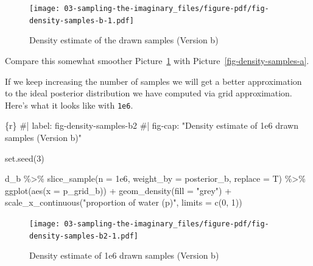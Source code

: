 \documentclass[
  letterpaper,
  DIV=11,
  numbers=noendperiod]{scrreprt}
\newenvironment{Shaded}{\begin{snugshade}}{\end{snugshade}}
\newcommand{\AttributeTok}[1]{\textcolor[rgb]{0.40,0.45,0.13}{#1}}
\newcommand{\CommentTok}[1]{\textcolor[rgb]{0.37,0.37,0.37}{#1}}
\newcommand{\DecValTok}[1]{\textcolor[rgb]{0.68,0.00,0.00}{#1}}
\newcommand{\FloatTok}[1]{\textcolor[rgb]{0.68,0.00,0.00}{#1}}
\newcommand{\FunctionTok}[1]{\textcolor[rgb]{0.28,0.35,0.67}{#1}}
\newcommand{\InformationTok}[1]{\textcolor[rgb]{0.37,0.37,0.37}{#1}}
\newcommand{\NormalTok}[1]{\textcolor[rgb]{0.00,0.23,0.31}{#1}}
\newcommand{\SpecialCharTok}[1]{\textcolor[rgb]{0.37,0.37,0.37}{#1}}
\newcommand{\StringTok}[1]{\textcolor[rgb]{0.13,0.47,0.30}{#1}}
\begin{document}
\begin{figure}[H]

{\centering \texttt{[image: 03-sampling-the-imaginary\_files/figure-pdf/fig-density-samples-b-1.pdf]}

}

\caption{\label{fig-density-samples-b}Density estimate of the drawn
samples (Version b)}

\end{figure}

Compare this somewhat smoother Picture~\ref{fig-density-samples-b} with
Picture~\ref{fig-density-samples-a}.

If we keep increasing the number of samples we will get a better
approximation to the ideal posterior distribution we have computed via
grid approximation. Here's what it looks like with \texttt{1e6}.

\begin{Shaded}
\begin{Highlighting}[]
\InformationTok{\textasciigrave{}\textasciigrave{}\textasciigrave{}\{r\}}
\CommentTok{\#| label: fig{-}density{-}samples{-}b2}
\CommentTok{\#| fig{-}cap: "Density estimate of 1e6 drawn samples (Version b)"}

\FunctionTok{set.seed}\NormalTok{(}\DecValTok{3}\NormalTok{)}

\NormalTok{d\_b }\SpecialCharTok{\%\textgreater{}\%} 
  \FunctionTok{slice\_sample}\NormalTok{(}\AttributeTok{n =} \FloatTok{1e6}\NormalTok{, }\AttributeTok{weight\_by =}\NormalTok{ posterior\_b, }\AttributeTok{replace =}\NormalTok{ T) }\SpecialCharTok{\%\textgreater{}\%} 
  \FunctionTok{ggplot}\NormalTok{(}\FunctionTok{aes}\NormalTok{(}\AttributeTok{x =}\NormalTok{ p\_grid\_b)) }\SpecialCharTok{+}
  \FunctionTok{geom\_density}\NormalTok{(}\AttributeTok{fill =} \StringTok{"grey"}\NormalTok{) }\SpecialCharTok{+}
  \FunctionTok{scale\_x\_continuous}\NormalTok{(}\StringTok{"proportion of water (p)"}\NormalTok{, }\AttributeTok{limits =} \FunctionTok{c}\NormalTok{(}\DecValTok{0}\NormalTok{, }\DecValTok{1}\NormalTok{))}
\InformationTok{\textasciigrave{}\textasciigrave{}\textasciigrave{}}
\end{Highlighting}
\end{Shaded}

\begin{figure}[H]

{\centering \texttt{[image: 03-sampling-the-imaginary\_files/figure-pdf/fig-density-samples-b2-1.pdf]}

}

\caption{\label{fig-density-samples-b2}Density estimate of 1e6 drawn
samples (Version b)}

\end{figure}
\end{document}
